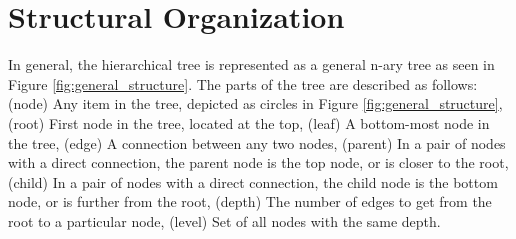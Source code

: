 \documentclass[12pt]{ucthesis}
\begin{document}
   \section{Structural Organization}\label{sec:structural_organization}
      In general, the hierarchical tree is represented as a general n-ary tree as seen in Figure
      \ref{fig:general_structure}. The parts of the tree are described as follows:
      (node) Any item in the tree, depicted as circles in Figure
      \ref{fig:general_structure}, (root) First node in the tree, located at the top,
      (leaf) A bottom-most node in the tree, (edge) A connection between any two
      nodes, (parent) In a pair of nodes with a direct connection, the parent node is
      the top node, or is closer to the root, (child) In a pair of nodes with a
      direct connection, the child node is the bottom node, or is further from the
      root, (depth) The number of edges to get from the root to a particular node,
      (level) Set of all nodes with the same depth.
\end{document}
